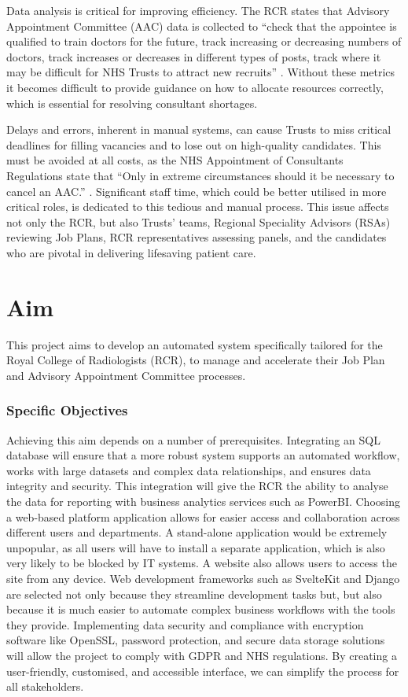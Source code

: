 Data analysis is critical for improving efficiency. The RCR states that Advisory Appointment Committee (AAC) data is collected to “check that the appointee is qualified to train doctors for the future, track increasing or decreasing numbers of doctors, track increases or decreases in different types of posts, track where it may be difficult for NHS Trusts to attract new recruits” \parencite{the_royal_college_of_radiologists_advisory_2024-1}. Without these metrics it becomes difficult to provide guidance on how to allocate resources correctly, which is essential for resolving consultant shortages.

Delays and errors, inherent in manual systems, can cause Trusts to miss critical deadlines for filling vacancies and to lose out on high-quality candidates. This must be avoided at all costs, as the NHS Appointment of Consultants Regulations state that “Only in extreme circumstances should it be necessary to cancel an AAC.” \parencite{national_health_service_appointment_of_consultants_national_2005}. Significant staff time, which could be better utilised in more critical roles, is dedicated to this tedious and manual process. This issue affects not only the RCR, but also Trusts’ teams, Regional Speciality Advisors (RSAs) reviewing Job Plans, RCR representatives assessing panels, and the candidates who are pivotal in delivering lifesaving patient care.
\section{Aim}
This project aims to develop an automated system specifically tailored for the Royal College of Radiologists (RCR), to manage and accelerate their Job Plan and Advisory Appointment Committee processes. 

\subsubsection{Specific Objectives}
Achieving this aim depends on a number of prerequisites. Integrating an SQL database will ensure that a more robust system supports an automated workflow, works with large datasets and complex data relationships, and ensures data integrity and security. This integration will give the RCR the ability to analyse the data for reporting with business analytics services such as PowerBI. Choosing a web-based platform application allows for easier access and collaboration across different users and departments. A stand-alone application would be extremely unpopular, as all users will have to install a separate application, which is also very likely to be blocked by IT systems. A website also allows users to access the site from any device. Web development frameworks such as SvelteKit and Django are selected not only because they streamline development tasks but, but also because it is much easier to automate complex business workflows with the tools they provide. Implementing data security and compliance with encryption software like OpenSSL, password protection, and secure data storage solutions will allow the project to comply with GDPR and NHS regulations. By creating a user-friendly, customised, and accessible interface, we can simplify the process for all stakeholders.